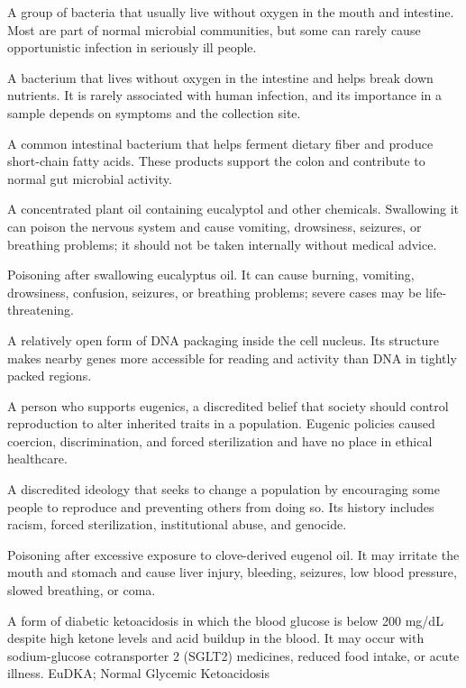  A group of bacteria that usually live without oxygen in the mouth and intestine. Most are part of normal microbial communities, but some can rarely cause opportunistic infection in seriously ill people.

 A bacterium that lives without oxygen in the intestine and helps break down nutrients. It is rarely associated with human infection, and its importance in a sample depends on symptoms and the collection site.

 A common intestinal bacterium that helps ferment dietary fiber and produce short-chain fatty acids. These products support the colon and contribute to normal gut microbial activity.

 A concentrated plant oil containing eucalyptol and other chemicals. Swallowing it can poison the nervous system and cause vomiting, drowsiness, seizures, or breathing problems; it should not be taken internally without medical advice.

 Poisoning after swallowing eucalyptus oil. It can cause burning, vomiting, drowsiness, confusion, seizures, or breathing problems; severe cases may be life-threatening.

 A relatively open form of DNA packaging inside the cell nucleus. Its structure makes nearby genes more accessible for reading and activity than DNA in tightly packed regions.

 A person who supports eugenics, a discredited belief that society should control reproduction to alter inherited traits in a population. Eugenic policies caused coercion, discrimination, and forced sterilization and have no place in ethical healthcare.

 A discredited ideology that seeks to change a population by encouraging some people to reproduce and preventing others from doing so. Its history includes racism, forced sterilization, institutional abuse, and genocide.

 Poisoning after excessive exposure to clove-derived eugenol oil. It may irritate the mouth and stomach and cause liver injury, bleeding, seizures, low blood pressure, slowed breathing, or coma.

 A form of diabetic ketoacidosis in which the blood glucose is below 200 mg/dL despite high ketone levels and acid buildup in the blood. It may occur with sodium-glucose cotransporter 2 (SGLT2) medicines, reduced food intake, or acute illness.
\synonyms
EuDKA; Normal Glycemic Ketoacidosis

